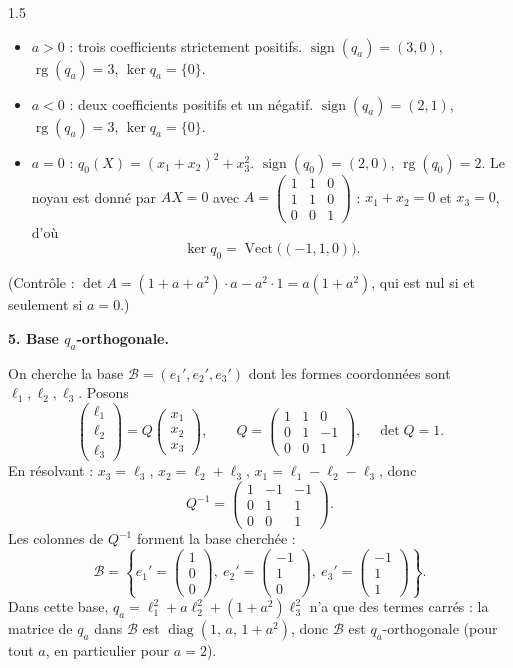 \documentclass[12pt]{article}
\begin{document}
\begin{spacing}{1.5}
\begin{itemize}
\item \underline{$a>0$} : trois coefficients strictement positifs. $\operatorname{sign}(q_a)=(3,0)$, $\operatorname{rg}(q_a)=3$, $\ker q_a=\{0\}$.
\item \underline{$a<0$} : deux coefficients positifs et un négatif. $\operatorname{sign}(q_a)=(2,1)$, $\operatorname{rg}(q_a)=3$, $\ker q_a=\{0\}$.
\item \underline{$a=0$} : $q_0(X)=(x_1+x_2)^2+x_3^2$. $\operatorname{sign}(q_0)=(2,0)$, $\operatorname{rg}(q_0)=2$. Le noyau est donné par $AX=0$ avec $A=\begin{pmatrix}1&1&0\\1&1&0\\0&0&1\end{pmatrix}$ : $x_1+x_2=0$ et $x_3=0$, d'où
\[
\ker q_0=\operatorname{Vect}\big((-1,1,0)\big).
\]
\end{itemize}
(Contrôle : $\det A=(1+a+a^2)\cdot a-a^2\cdot1=a(1+a^2)$, qui est nul si et seulement si $a=0$.)

\textbf{5. Base $q_a$-orthogonale.}

On cherche la base $\mathcal{B}=(e_1',e_2',e_3')$ dont les formes coordonnées sont $\ell_1,\ell_2,\ell_3$. Posons
\[
\begin{pmatrix}\ell_1\\ \ell_2\\ \ell_3\end{pmatrix}=Q\begin{pmatrix}x_1\\x_2\\x_3\end{pmatrix},\qquad Q=\begin{pmatrix}1&1&0\\0&1&-1\\0&0&1\end{pmatrix},\quad\det Q=1 .
\]
En résolvant : $x_3=\ell_3$, $x_2=\ell_2+\ell_3$, $x_1=\ell_1-\ell_2-\ell_3$, donc
\[
Q^{-1}=\begin{pmatrix}1&-1&-1\\0&1&1\\0&0&1\end{pmatrix}.
\]
Les colonnes de $Q^{-1}$ forment la base cherchée :
\[
\mathcal{B}=\left\{e_1'=\begin{pmatrix}1\\0\\0\end{pmatrix},\ e_2'=\begin{pmatrix}-1\\1\\0\end{pmatrix},\ e_3'=\begin{pmatrix}-1\\1\\1\end{pmatrix}\right\}.
\]
Dans cette base, $q_a=\ell_1^2+a\ell_2^2+(1+a^2)\ell_3^2$ n'a que des termes carrés : la matrice de $q_a$ dans $\mathcal{B}$ est $\operatorname{diag}(1,\,a,\,1+a^2)$, donc $\mathcal{B}$ est $q_a$-orthogonale (pour tout $a$, en particulier pour $a=2$).


\end{spacing}
\end{document}
